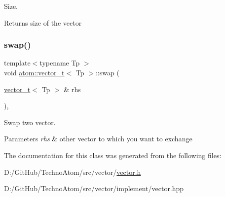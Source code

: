 Size. 

\begin{DoxyReturn}{Returns}
size of the vector 
\end{DoxyReturn}
\mbox{\label{classatom_1_1vector__t_a37462493cd88e3c610cc0004b9bb0b57}} 
\subsubsection{\texorpdfstring{swap()}{swap()}}
{\footnotesize\ttfamily template$<$typename Tp $>$ \\
void \hyperlink{classatom_1_1vector__t}{atom\+::vector\+\_\+t}$<$ Tp $>$\+::swap (\begin{DoxyParamCaption}\item[{\hyperlink{classatom_1_1vector__t}{vector\+\_\+t}$<$ Tp $>$ \&}]{rhs }\end{DoxyParamCaption})\hspace{0.3cm}{\ttfamily [inline]}, {\ttfamily [noexcept]}}



Swap two vector. 


\begin{DoxyParams}{Parameters}
{\em rhs} & other vector to which you want to exchange \\
\hline
\end{DoxyParams}


The documentation for this class was generated from the following files\+:\begin{DoxyCompactItemize}
\item 
D\+:/\+Git\+Hub/\+Techno\+Atom/src/vector/\hyperlink{vector_8h}{vector.\+h}\item 
D\+:/\+Git\+Hub/\+Techno\+Atom/src/vector/implement/vector.\+hpp\end{DoxyCompactItemize}

